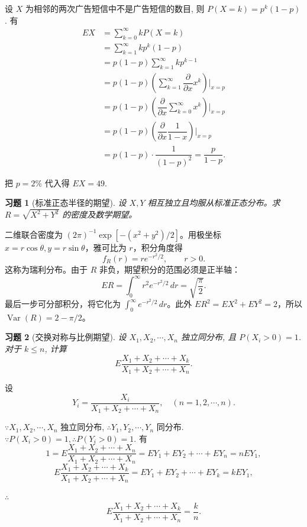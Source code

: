 \documentclass[12pt,fontset=fandol]{ctexart}
\newtheorem{exercise}{习题}[section]
\begin{document}
\begin{solve}\label{a:A5.5}
    设 $X$ 为相邻的两次广告短信中不是广告短信的数目, 则 $P(X=k)=p^k(1-p)$. 有
    \begin{align*}
        EX & =\sum\limits_{k=0}^\infty kP(X=k) \\
        & =\sum\limits_{k=1}^\infty kp^k(1-p) \\
        & =p(1-p)\sum\limits_{k=1}^\infty kp^{k-1} \\
        & =p(1-p)\left(\sum\limits_{k=1}^\infty\dfrac{\partial}{\partial x}x^k\right)\Bigg|_{x=p} \\
        & =p(1-p)\left(\dfrac{\partial}{\partial x}\sum\limits_{k=0}^\infty x^k\right)\Bigg|_{x=p} \\
        & =p(1-p)\left(\dfrac{\partial}{\partial x}\dfrac{1}{1-x}\right)\Bigg|_{x=p} \\
        & =p(1-p)\cdot\dfrac{1}{(1-p)^2}=\dfrac{p}{1-p}.
    \end{align*}

    把 $p=2\%$ 代入得 $EX=49$.
\end{solve}

\begin{exercise}[标准正态半径的期望]\label{q:A5.8}
设 $X,Y$ 相互独立且均服从标准正态分布。求 $R=\sqrt{X^2+Y^2}$ 的密度及数学期望。\par{}
\end{exercise}

\begin{solve}\label{a:A5.8}二维联合密度为 $(2\pi)^{-1}\exp[-(x^2+y^2)/2]$。用极坐标 $x=r\cos\theta,y=r\sin\theta$，雅可比为 $r$，积分角度得\[f_R(r)=r e^{-r^2/2},\qquad r>0.\]这称为瑞利分布。由于 $R$ 非负，期望积分的范围必须是正半轴：\[ER=\int_0^\infty r^2e^{-r^2/2}\,dr=\sqrt{\frac\pi2}.\]最后一步可分部积分，将它化为 $\int_0^\infty e^{-r^2/2}\,dr$。此外 $ER^2=EX^2+EY^2=2$，所以 $\operatorname{Var}(R)=2-\pi/2$。\end{solve}

\begin{exercise}[交换对称与比例期望]\label{q:A5.9}
设 $X_1,X_2,\cdots,X_n$ 独立同分布, 且 $P(X_i>0)=1$. 对于 $k\leq n$, 计算
    \[E\dfrac{X_1+X_2+\cdots+X_k}{X_1+X_2+\cdots+X_n}.\]\par{}
\end{exercise}

\begin{solve}\label{a:A5.9}
    设
    \[Y_i=\dfrac{X_i}{X_1+X_2+\cdots+X_n},\quad (n=1,2,\cdots,n).\]
    
    $\because X_1,X_2,\cdots,X_n$ 独立同分布, $\therefore Y_1,Y_2,\cdots,Y_n$ 同分布. $\because P(X_i>0)=1,\therefore P(Y_i>0)=1$. 有
    \[1=E\dfrac{X_1+X_2+\cdots+X_n}{X_1+X_2+\cdots+X_n}=EY_1+EY_2+\cdots+EY_n=nEY_1,\]
    \[E\dfrac{X_1+X_2+\cdots+X_k}{X_1+X_2+\cdots+X_n}=EY_1+EY_2+\cdots+EY_k=kEY_1,\]

    $\therefore$
    \[E\dfrac{X_1+X_2+\cdots+X_k}{X_1+X_2+\cdots+X_n}=\dfrac{k}{n}.\]
\end{solve}
\end{document}
